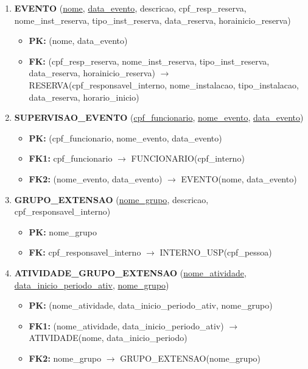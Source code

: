 \documentclass{article}
\begin{document}
\begin{enumerate}
    \item \textbf{EVENTO} (\underline{nome}, \underline{data\_evento}, descricao, cpf\_resp\_reserva, nome\_inst\_reserva, tipo\_inst\_reserva, data\_reserva, horainicio\_reserva)
        \begin{itemize}
            \item \textbf{PK:} (nome, data\_evento)
            \item \textbf{FK:} (cpf\_resp\_reserva, nome\_inst\_reserva, tipo\_inst\_reserva, data\_reserva, horainicio\_reserva) $\rightarrow$ RESERVA(cpf\_responsavel\_interno, nome\_instalacao, tipo\_instalacao, data\_reserva, horario\_inicio)
        \end{itemize}
        
    \item \textbf{SUPERVISAO\_EVENTO} (\underline{cpf\_funcionario}, \underline{nome\_evento}, \underline{data\_evento})
        \begin{itemize}
            \item \textbf{PK:} (cpf\_funcionario, nome\_evento, data\_evento)
            \item \textbf{FK1:} cpf\_funcionario $\rightarrow$ FUNCIONARIO(cpf\_interno)
            \item \textbf{FK2:} (nome\_evento, data\_evento) $\rightarrow$ EVENTO(nome, data\_evento)
        \end{itemize}

    \item \textbf{GRUPO\_EXTENSAO} (\underline{nome\_grupo}, descricao, cpf\_responsavel\_interno)
        \begin{itemize}
            \item \textbf{PK:} nome\_grupo
            \item \textbf{FK:} cpf\_responsavel\_interno $\rightarrow$ INTERNO\_USP(cpf\_pessoa)
        \end{itemize}

    \item \textbf{ATIVIDADE\_GRUPO\_EXTENSAO} (\underline{nome\_atividade}, \underline{data\_inicio\_periodo\_ativ}, \underline{nome\_grupo})
        \begin{itemize}
            \item \textbf{PK:} (nome\_atividade, data\_inicio\_periodo\_ativ, nome\_grupo)
            \item \textbf{FK1:} (nome\_atividade, data\_inicio\_periodo\_ativ) $\rightarrow$ ATIVIDADE(nome, data\_inicio\_periodo)
            \item \textbf{FK2:} nome\_grupo $\rightarrow$ GRUPO\_EXTENSAO(nome\_grupo)
        \end{itemize}
\end{enumerate}
\end{document}
